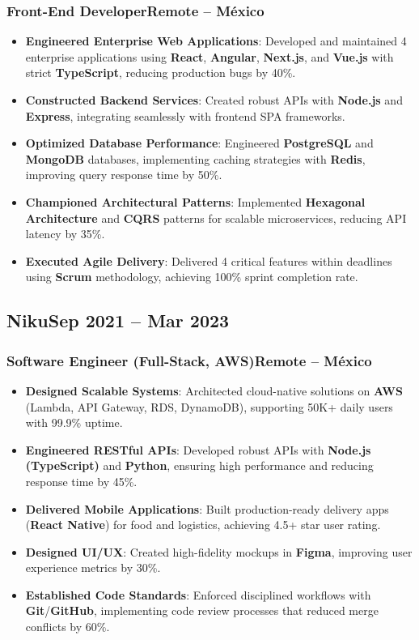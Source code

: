 \documentclass[a4paper,10pt]{article}
\newcommand{\kw}[1]{\textbf{\textcolor{keyword}{#1}}}
\newcommand{\tech}[1]{\textbf{\textcolor{tech}{#1}}}
\begin{document}
\subsubsection*{Front-End Developer\hfill Remote -- México}
\begin{itemize}[noitemsep, leftmargin=*]
    \item \textbf{Engineered Enterprise Web Applications}: Developed and maintained 4 enterprise applications using \tech{React}, \tech{Angular}, \tech{Next.js}, and \tech{Vue.js} with strict \tech{TypeScript}, reducing production bugs by 40\%.
    \item \textbf{Constructed Backend Services}: Created robust APIs with \tech{Node.js} and \tech{Express}, integrating seamlessly with frontend SPA frameworks.
    \item \textbf{Optimized Database Performance}: Engineered \kw{PostgreSQL} and \kw{MongoDB} databases, implementing caching strategies with \tech{Redis}, improving query response time by 50\%.
    \item \textbf{Championed Architectural Patterns}: Implemented \kw{Hexagonal Architecture} and \kw{CQRS} patterns for scalable microservices, reducing API latency by 35\%.
    \item \textbf{Executed Agile Delivery}: Delivered 4 critical features within deadlines using \kw{Scrum} methodology, achieving 100\% sprint completion rate.
\end{itemize}

\subsection*{Niku\hfill\textbf{Sep 2021 -- Mar 2023}}
\subsubsection*{Software Engineer (Full-Stack, AWS)\hfill Remote -- México}
\begin{itemize}[noitemsep, leftmargin=*]
    \item \textbf{Designed Scalable Systems}: Architected cloud-native solutions on \tech{AWS} (Lambda, API Gateway, RDS, DynamoDB), supporting 50K+ daily users with 99.9\% uptime.
    \item \textbf{Engineered RESTful APIs}: Developed robust APIs with \tech{Node.js (TypeScript)} and \tech{Python}, ensuring high performance and reducing response time by 45\%.
    \item \textbf{Delivered Mobile Applications}: Built production-ready delivery apps (\tech{React Native}) for food and logistics, achieving 4.5+ star user rating.
    \item \textbf{Designed UI/UX}: Created high-fidelity mockups in \tech{Figma}, improving user experience metrics by 30\%.
    \item \textbf{Established Code Standards}: Enforced disciplined workflows with \tech{Git}/\tech{GitHub}, implementing code review processes that reduced merge conflicts by 60\%.
\end{itemize}
\end{document}
